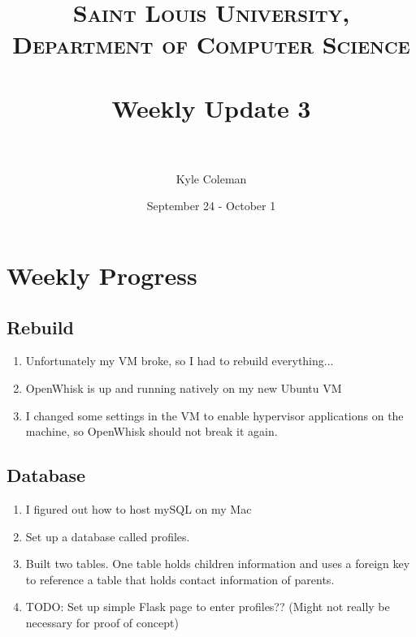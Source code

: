 \documentclass[paper=a4, fontsize=12pt]{scrartcl} %
\title{	
\normalfont \normalsize 
\textsc{Saint Louis University, Department of Computer Science} \\ [25pt] %
\horrule{0.5pt} \\[0.4cm] %
\huge Weekly Update 3\\ %
\horrule{2pt} \\[0.5cm] %
}
\author{Kyle Coleman} %
\date{September 24 - October 1} %
\numberwithin{equation}{section} %
\numberwithin{figure}{section} %
\numberwithin{table}{section} %
\begin{document}
\maketitle %


\section{Weekly Progress}





\subsection{Rebuild}
\begin{enumerate}
	\item Unfortunately my VM broke, so I had to rebuild everything...
    \item OpenWhisk is up and running natively on my new Ubuntu VM 
	\item I changed some settings in the VM to enable hypervisor applications on the machine, so OpenWhisk should not break it again.
\end{enumerate}


\subsection{Database}
\begin{enumerate}
	\item I figured out how to host mySQL on my Mac
	\item Set up a database called profiles. 
	\item Built two tables. One table holds children information and uses a foreign key to reference a table that holds contact information of parents.
	\item TODO: Set up simple Flask page to enter profiles?? (Might not really be necessary for proof of concept)
\end{enumerate}



\end{document}
